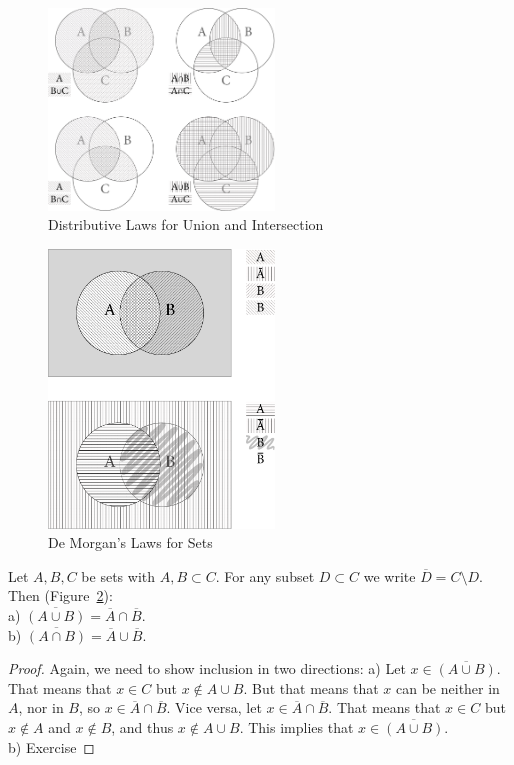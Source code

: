 \begin{figure}[t]
\begin{center}
\includegraphics[width=6cm]{pic/VennDistributiveLaws.pdf}
\end{center}
\caption{Distributive Laws for Union and Intersection}
\label{figvenndist}
\end{figure}

\begin{figure}[t]
\begin{center}
\includegraphics[width=6cm]{pic/VennDeMorganLaws.pdf}
\end{center}
\caption{De Morgan's Laws for Sets}
\label{figdemorganset}
\end{figure}

\begin{thm}
Let $A,B,C$ be sets with $A,B\subset C$. For any subset $D\subset C$ we
write $\overline{D}=C\setminus D$. Then (Figure~\ref{figdemorganset}):\\
a) $\overline{(A\cup B)}=\overline{A}\cap\overline{B}$.\\
b) $\overline{(A\cap B)}=\overline{A}\cup\overline{B}$.
\end{thm}
\begin{proof}
Again, we need to show inclusion in two directions:
a) Let $x\in \overline{(A\cup B)}$. That means that $x\in C$ but $x\not\in
A\cup B$. But that means that $x$ can be neither in $A$, nor in $B$, so
$x\in \overline{A}\cap\overline{B}$. Vice versa, let $x\in
\overline{A}\cap\overline{B}$. That means that $x\in C$ but $x\not\in A$ and
$x\not\in B$, and thus $x\not\in A\cup B$. This implies that
$x\in\overline{(A\cup B)}$.\\
b) Exercise
\end{proof}

